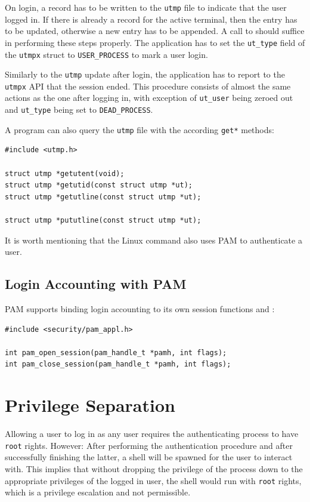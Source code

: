 \documentclass[10pt,a4paper,titlepage,twoside,english,final]{zhawreprt}
\begin{document}
On \gls{login}, a record has to be written to the \texttt{utmp} file to indicate that the user logged in.
If there is already a record for the active \gls{terminal}, then the entry has to be updated, otherwise a new entry has to be appended.
A call to \cite{pututxline} should suffice in performing these steps properly.
The application has to set the \texttt{ut\_type} field of the \texttt{utmpx} struct to \texttt{USER\_PROCESS} to mark a user \gls{login}.

Similarly to the \texttt{utmp} update after \gls{login}, the application has to report to the \texttt{utmpx} \gls{API} that the session ended.
This procedure consists of almost the same actions as the one after logging in, with exception of \texttt{ut\_user} being zeroed out and \texttt{ut\_type} being set to \texttt{DEAD\_PROCESS}\citep[p.828]{KerriskTLPI}.

A program can also query the \texttt{utmp} file with the according \texttt{get*} methods:
\setlistingC
\begin{lstlisting}[caption={\texttt{utmpx} \gls{API} functions},label=lst:UtmpxApiFunctions]
#include <utmp.h>

struct utmp *getutent(void);
struct utmp *getutid(const struct utmp *ut);
struct utmp *getutline(const struct utmp *ut);

struct utmp *pututline(const struct utmp *ut);
\end{lstlisting}

It is worth mentioning that the \gls{Linux} command \cite{login} also uses PAM to authenticate a user.

\subsection{Login Accounting with PAM}\label{ssec:DesignLoginAccountingWithPAM}
\gls{PAM} supports binding \gls{login} accounting to its own session functions \cite{pam_open_session} and \cite{pam_close_session}:
\setlistingC
\begin{lstlisting}[caption={\gls{PAM} session management},label=lst:PAMSessionManagement]
#include <security/pam_appl.h>

int pam_open_session(pam_handle_t *pamh, int flags);
int pam_close_session(pam_handle_t *pamh, int flags);
\end{lstlisting}

\section{Privilege Separation}\label{sec:DesignPrivilegeSeparation}
Allowing a user to log in as any user requires the authenticating process to have \texttt{root} rights.
However: After performing the authentication procedure and after successfully finishing the latter, a \gls{shell} will be spawned for the user to interact with.
This implies that without dropping the privilege of the process down to the appropriate privileges of the logged in user, the \gls{shell} would run with \texttt{root} rights, which is a privilege escalation and not permissible.
\end{document}
